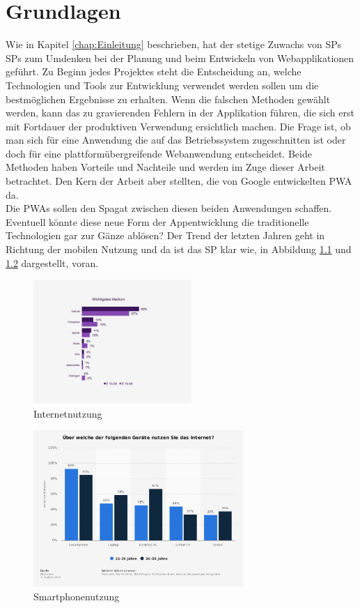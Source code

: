 \chapter{Grundlagen}
\thispagestyle{standard}
\pagestyle{standard}
\renewcommand{\footrulewidth}{0.4pt}

Wie in Kapitel \ref{chap:Einleitung} beschrieben, hat der stetige Zuwachs von \acl{SP}s \acs{SP}s \cite{Geraetenutzung} zum Umdenken bei der Planung und beim Entwickeln von Webapplikationen geführt.
Zu Beginn jedes Projektes steht die Entscheidung an, welche Technologien und Tools zur Entwicklung verwendet werden sollen um die bestmöglichen Ergebnisse zu erhalten.
Wenn die falschen Methoden gewählt werden, kann das zu gravierenden Fehlern in der Applikation führen, die sich erst mit Fortdauer der produktiven Verwendung ersichtlich machen. 
Die Frage ist, ob man sich für eine Anwendung die auf das Betriebssystem zugeschnitten ist oder doch für eine plattformübergreifende Webanwendung entscheidet. Beide Methoden haben Vorteile und Nachteile und werden im Zuge dieser Arbeit betrachtet. Den Kern der Arbeit aber stellten, die von Google entwickelten \acs{PWA} \cite{PWA} da. \\Die \acs{PWA}s sollen den Spagat zwischen diesen beiden Anwendungen schaffen. Eventuell könnte diese neue Form der Appentwicklung die traditionelle Technologien gar zur Gänze ablösen?
Der Trend der letzten Jahren geht in Richtung der mobilen Nutzung und da ist das \acl{SP} klar wie, in Abbildung \ref{fig:Internetnutzung} und \ref{fig:Smartphonenutzung} dargestellt, voran.  

\begin{figure}[h]
	\centering
	\includegraphics[width=6cm]{BilderAllgemein/Internetnutzung}\medskip
	\caption{Internetnutzung \cite{Geraetenutzung}}
	\label{fig:Internetnutzung}
\end{figure}

\begin{figure}[h]
	\centering
	\includegraphics[width=8cm]{BilderAllgemein/SmartPhoneNutzung}\medskip
	\caption{Smartphonenutzung \cite{Geraetenutzung}}
	\label{fig:Smartphonenutzung}
\end{figure}

